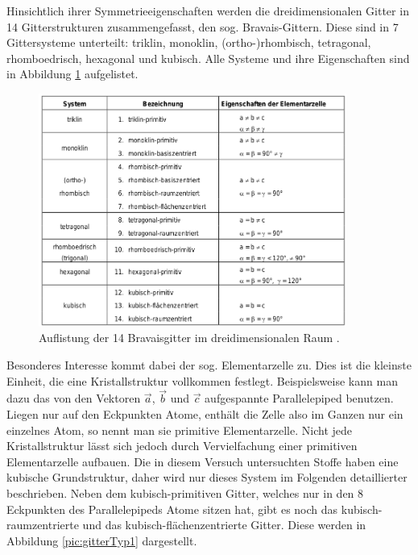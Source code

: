 Hinsichtlich ihrer Symmetrieeigenschaften werden die dreidimensionalen Gitter in 14 Gitterstrukturen zusammengefasst, den sog. Bravais-Gittern. Diese sind in 7 Gittersysteme unterteilt: triklin, monoklin, (ortho-)rhombisch, tetragonal, rhomboedrisch, hexagonal und kubisch. Alle Systeme und ihre Eigenschaften sind in Abbildung \ref{pic:bravais} aufgelistet.
\begin{figure}[htbp]
	\includegraphics[width=0.9\textwidth]{../pics/bravais.png}
	\caption{Auflistung der 14 Bravaisgitter im dreidimensionalen Raum \cite{Anleitung}.}
	\label{pic:bravais}
\end{figure}

Besonderes Interesse  kommt dabei der sog. Elementarzelle zu. Dies ist die kleinste Einheit, die eine Kristallstruktur vollkommen festlegt. Beispielsweise kann man dazu das von den Vektoren $\vec{a}$, $\vec{b}$ und $\vec{c}$ aufgespannte Parallelepiped benutzen. Liegen nur auf den Eckpunkten Atome, enthält die Zelle also im Ganzen nur ein einzelnes Atom, so nennt man sie primitive Elementarzelle. 
Nicht jede Kristallstruktur lässt sich jedoch durch Vervielfachung einer primitiven Elementarzelle aufbauen. Die in diesem Versuch untersuchten Stoffe haben eine kubische Grundstruktur, daher wird nur dieses System im Folgenden detaillierter beschrieben. Neben dem kubisch-primitiven Gitter, welches nur in den 8 Eckpunkten des Parallelepipeds Atome sitzen hat, gibt es noch das kubisch-raumzentrierte und das kubisch-flächenzentrierte Gitter. Diese werden in Abbildung \ref{pic:gitterTyp1} dargestellt.

